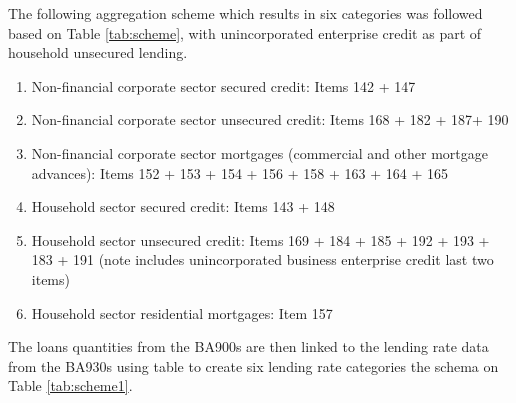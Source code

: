 \documentclass[
]{article}
\providecommand{\tightlist}{%
  \setlength{\itemsep}{0pt}\setlength{\parskip}{0pt}}
\begin{document}
The following aggregation scheme which results in six categories was followed based on Table \ref{tab:scheme}, with unincorporated enterprise credit as part of household unsecured lending.

\begin{enumerate}
\def\labelenumi{\alph{enumi}.}
\tightlist
\item
  Non-financial corporate sector secured credit: Items 142 + 147
\item
  Non-financial corporate sector unsecured credit: Items 168 + 182 + 187+ 190
\item
  Non-financial corporate sector mortgages (commercial and other mortgage advances): Items 152 + 153 + 154 + 156 + 158 + 163 + 164 + 165
\item
  Household sector secured credit: Items 143 + 148\\
\item
  Household sector unsecured credit: Items 169 + 184 + 185 + 192 + 193 + 183 + 191 (note includes unincorporated business enterprise credit last two items)
\item
  Household sector residential mortgages: Item 157
\end{enumerate}

\newpage

The loans quantities from the BA900s are then linked to the lending rate data from the BA930s using table to create six lending rate categories the schema on Table \ref{tab:scheme1}.

\providecommand{\docline}[3]{\noalign{\global\setlength{\arrayrulewidth}{#1}}\arrayrulecolor[HTML]{#2}\cline{#3}}

\setlength{\tabcolsep}{0pt}

\renewcommand*{\arraystretch}{1.2}
\end{document}
